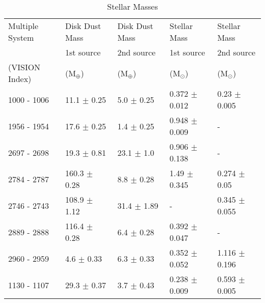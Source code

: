 \onecolumn
\begin{table}
\caption{Stellar Masses}              %
\label{table:stellarmass}      %
\centering                                      %
\begin{tabular}{l l l l l}          %
\hline\hline                        %
Multiple System & Disk Dust Mass & Disk Dust Mass & Stellar Mass & Stellar Mass %
\\
  & \small{1st source} & \small{2nd source} & \small{1st source} & \small{2nd source} %
  \\
(VISION Index) & (M$_{\oplus}$) & (M$_{\oplus}$) & (M$_{\odot}$) & (M$_{\odot}$) %
\\
\hline\hline 
    1000 - 1006 & 11.1 $\pm$ 0.25 & 5.0 $\pm$ 0.25 & 0.372 $\pm$ 0.012 & 0.23 $\pm$ 0.005 %
    \\
    1956 - 1954 & 17.6 $\pm$ 0.25 & 1.4 $\pm$ 0.25 &	0.948 $\pm$ 0.009 & - %
    \\
    2697 - 2698	& 19.3 $\pm$ 0.81 & 23.1 $\pm$ 1.0 & 0.906 $\pm$ 0.138 & -	%
    \\
    2784 - 2787	& 160.3 $\pm$ 0.28 & 8.8 $\pm$ 0.28 & 1.49 $\pm$ 0.345 & 0.274 $\pm$ 0.05 %
    \\
    2746 - 2743	& 108.9 $\pm$ 1.12 & 31.4 $\pm$ 1.89 & - & 0.345 $\pm$ 0.055 %
    \\
    2889 - 2888	& 116.4 $\pm$ 0.28 & 6.4 $\pm$ 0.28 & 0.392 $\pm$ 0.047 & - %
    \\
    2960 - 2959	& 4.6 $\pm$ 0.33 & 6.3 $\pm$ 0.33 & 0.352 $\pm$ 0.052 & 1.116 $\pm$ 0.196 %
    \\
    1130 - 1107	& 29.3 $\pm$ 0.37 & 3.7 $\pm$ 0.43 & 0.238 $\pm$ 0.009 & 0.593 $\pm$ 0.005 %

\end{tabular}
\end{table}
